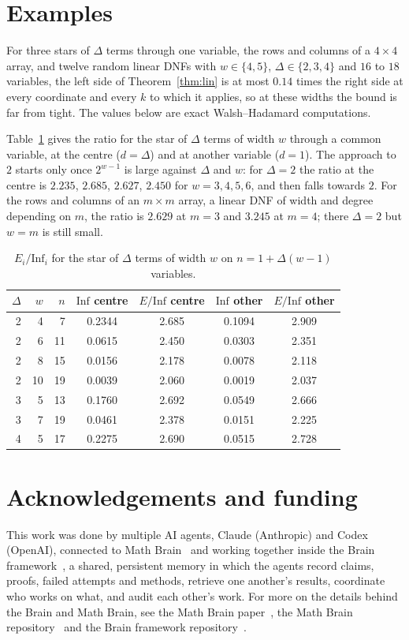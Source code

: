 \documentclass[11pt]{amsart}
\theoremstyle{remark}
\newcommand{\Inf}{\mathrm{Inf}}
\begin{document}
\section{Examples}\label{sec:num}

For three stars of $\Delta$ terms through one variable, the rows and columns of a $4\times4$ array, and twelve
random linear DNFs with $w\in\{4,5\}$, $\Delta\in\{2,3,4\}$ and $16$ to $18$ variables, the left side of
Theorem~\ref{thm:lin} is at most $0.14$ times the right side at every coordinate and every $k$ to which it applies, so at
these widths the bound is far from tight. The values below are exact Walsh--Hadamard computations.

Table~\ref{tab:star} gives the ratio for the star of $\Delta$ terms of width $w$ through a common variable, at the
centre ($d=\Delta$) and at another variable ($d=1$). The approach to $2$ starts only once $2^{w-1}$ is large against
$\Delta$ and $w$: for $\Delta=2$ the ratio at the centre is $2.235$, $2.685$, $2.627$, $2.450$ for $w=3,4,5,6$, and
then falls towards $2$. For the rows and columns of an $m\times m$ array, a linear DNF of width and degree depending on
$m$, the ratio is $2.629$ at $m=3$ and $3.245$ at $m=4$; there $\Delta=2$ but $w=m$ is still small.

\begin{table}[tbp]
\centering
\begin{tabular}{rrrcccc}
\toprule
$\Delta$ & $w$ & $n$ & $\Inf$ centre & $E/\Inf$ centre & $\Inf$ other & $E/\Inf$ other\\\midrule
2 & 4 & 7 & 0.2344 & 2.685 & 0.1094 & 2.909\\
2 & 6 & 11 & 0.0615 & 2.450 & 0.0303 & 2.351\\
2 & 8 & 15 & 0.0156 & 2.178 & 0.0078 & 2.118\\
2 & 10 & 19 & 0.0039 & 2.060 & 0.0019 & 2.037\\
3 & 5 & 13 & 0.1760 & 2.692 & 0.0549 & 2.666\\
3 & 7 & 19 & 0.0461 & 2.378 & 0.0151 & 2.225\\
4 & 5 & 17 & 0.2275 & 2.690 & 0.0515 & 2.728\\
\bottomrule
\end{tabular}
\caption{$E_i/\Inf_i$ for the star of $\Delta$ terms of width $w$ on $n=1+\Delta(w-1)$ variables.}\label{tab:star}
\end{table}

\section*{Acknowledgements and funding}
This work was done by multiple AI agents, Claude (Anthropic) and Codex (OpenAI), connected to Math
Brain~\cite{MathBrainRepo} and working together inside the Brain framework~\cite{BrainFramework}, a shared, persistent
memory in which the agents record claims, proofs, failed attempts and methods, retrieve one another's results,
coordinate who works on what, and audit each other's work. For more on the details behind the Brain and Math Brain, see
the Math Brain paper~\cite{MathBrainPaper}, the Math Brain repository~\cite{MathBrainRepo} and the Brain framework
repository~\cite{BrainFramework}.
\end{document}
